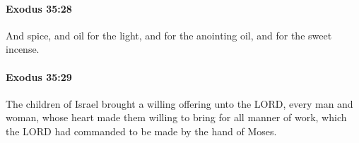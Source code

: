 		\paragraph{Exodus 35:28} %
			\label{EXODUS-35-28}

			And spice, and oil for the light, and for the anointing oil, and for the sweet incense.


		\paragraph{Exodus 35:29} %
			\label{EXODUS-35-29}

			The children of Israel brought a willing offering unto the LORD, every man and woman, whose heart made them willing to bring for all manner of work, which the LORD had commanded to be made by the hand of Moses.


